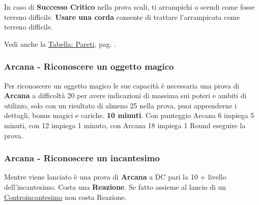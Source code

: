 \begin{multicols}{2}
In caso di \textbf{Successo Critico} nella prova scali, ti arrampichi o scendi come fosse terreno difficile. \textbf{Usare una corda} consente di trattare l'arrampicata come terreno difficile.

Vedi anche la \hyperlink{pareti}{Tabella: Pareti}, pag. \pageref{pareti}.

\titlespacing*{\subsubsection}{0pt}{0.5em}{0.5em}\subsubsection*{Arcana - Riconoscere un oggetto magico} \label{rinoscereoggettomagico}\hypertarget{rinoscereoggettomagico}{}

Per riconoscere un oggetto magico le sue capacità è necessaria una prova di \textbf{Arcana} a difficoltà 20 per avere indicazioni di massima sui poteri e ambiti di utilizzo, solo con un risultato di almeno 25 nella prova, puoi apprenderne i dettagli, bonus magici e cariche. \textbf{10 minuti}. Con punteggio Arcana 6 impiega 5 minuti, con 12 impiega 1 minuto, con Arcana 18 impiega 1 Round eseguire la prova.

\titlespacing*{\subsubsection}{0pt}{0.5em}{0.5em}\subsubsection*{Arcana - Riconoscere un incantesimo}  \label{riconoscereincantesimo}\hypertarget{riconoscereincantesimo}{}
Mentre viene lanciato è una prova di \textbf{Arcana} a DC pari la 10 + livello dell'incantesimo. Costa una \textbf{Reazione}. Se fatto assieme al lancio di un \hyperlink{Controincantesimo}{Controincantesimo} non costa Reazione.


\end{multicols}
